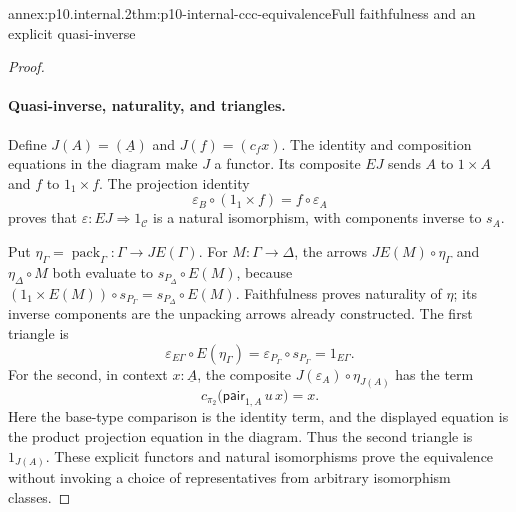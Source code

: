\begin{annexitem}{annex:p10.internal.2}{thm:p10-internal-ccc-equivalence}{Full faithfulness and an explicit quasi-inverse}
\begin{proof}
\paragraph{Quasi-inverse, naturality, and triangles.}
Define \(J(A)=(\underline A)\) and \(J(f)=(c_fx)\).
The identity and composition equations in the diagram make \(J\) a
functor.  Its composite \(EJ\) sends \(A\) to \(1\times A\) and
\(f\) to \(1_1\times f\).
The projection identity
\[
 \varepsilon_B\circ(1_1\times f)=f\circ\varepsilon_A
\]
proves that \(\varepsilon:EJ\Rightarrow1_{\mathcal C}\) is a natural
isomorphism, with components inverse to \(s_A\).

Put \(\eta_\Gamma=\operatorname{pack}_\Gamma:\Gamma\to JE(\Gamma)\).
For \(M:\Gamma\to\Delta\), the arrows
\(JE(M)\circ\eta_\Gamma\) and \(\eta_\Delta\circ M\) both evaluate to
\(s_{P_\Delta}\circ E(M)\), because
\((1_1\times E(M))\circ s_{P_\Gamma}=s_{P_\Delta}\circ E(M)\).
Faithfulness proves naturality of \(\eta\); its inverse components
are the unpacking arrows already constructed.
The first triangle is
\[
 \varepsilon_{E\Gamma}\circ E(\eta_\Gamma)
     =\varepsilon_{P_\Gamma}\circ s_{P_\Gamma}=1_{E\Gamma}.
\]
For the second, in context \(x:\underline A\), the composite
\(J(\varepsilon_A)\circ\eta_{J(A)}\) has the term
\[
 c_{\pi_2}\bigl(\mathsf{pair}_{1,A}\,u\,x\bigr)=x.
\]
Here the base-type comparison is the identity term, and the displayed
equation is the product projection equation in the diagram.
Thus the second triangle is \(1_{J(A)}\).
These explicit functors and natural isomorphisms prove the equivalence
without invoking a choice of representatives from arbitrary isomorphism classes.
\end{proof}
\end{annexitem}

